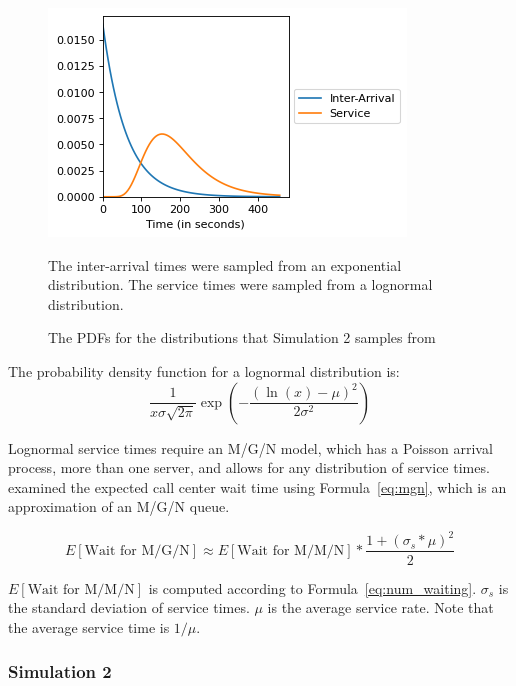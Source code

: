 \begin{figure}[h]
  \includegraphics{figures/montecarlo/expon_lognorm.png}
  \begin{captiontext}
    The inter-arrival times were sampled from an exponential distribution.
    The service times were sampled from a lognormal distribution.
  \end{captiontext}
  \caption{
    The PDFs for the distributions that Simulation 2 samples from
  }\label{fig:simple_sim2_dists}
\end{figure}

The probability density function for a lognormal distribution is:
\[
  \frac{1}{x \sigma \sqrt{2 \pi}}
  \exp{\left( - \frac{\left( \ln(x) - \mu \right)^2}{2 \sigma^2} \right)}
\]

Lognormal service times require an M/G/N model, which has a Poisson arrival
process, more than one server, and allows for any distribution of service times.
\citet{queue1} examined the expected call center wait time using
Formula~\ref{eq:mgn}, which is an approximation of an M/G/N queue.

\begin{equation}
  E[\text{Wait for M/G/N}] \approx E[\text{Wait for M/M/N}] *
  \frac{1 + (\sigma_s * \mu)^2}{2}
\label{eq:mgn}
\end{equation}

$E[\text{Wait for M/M/N}]$ is computed according to
Formula~\ref{eq:num_waiting}.
$\sigma_s$ is the standard deviation of service times.
$\mu$ is the average service rate.
Note that the average service time is $1/\mu$.

\subsubsection{Simulation 2}

